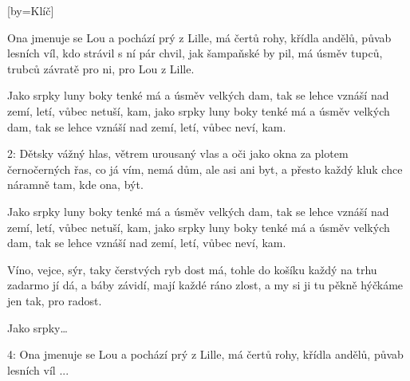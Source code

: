 [by={Klíč}]

\beginverse{}
Ona jmenuje se Lou a pochází prý z Lille,
má čertů rohy, křídla andělů, půvab lesních víl,
kdo strávil s ní pár chvil, jak šampaňské by pil,
má úsměv tupců, trubců závratě pro ni, pro Lou z Lille.
\endverse{}

\beginchorus{}
Jako srpky luny boky tenké má a úsměv velkých dam,
tak se lehce vznáší nad zemí, letí, vůbec netuší, kam,
jako srpky luny boky tenké má a úsměv velkých dam,
tak se lehce vznáší nad zemí, letí, vůbec neví, kam.
\endchorus{}

\beginverse{}
2: Dětsky vážný hlas, větrem urousaný vlas
a oči jako okna za plotem černočerných řas,
co já vím, nemá dům, ale asi ani byt,
a přesto každý kluk chce náramně tam, kde ona, být.
\endverse{}

\beginchorus{}
Jako srpky luny boky tenké má a úsměv velkých dam,
tak se lehce vznáší nad zemí, letí, vůbec netuší, kam,
jako srpky luny boky tenké má a úsměv velkých dam,
tak se lehce vznáší nad zemí, letí, vůbec neví, kam.
\endchorus{}

\beginverse{}
Víno, vejce, sýr, taky čerstvých ryb dost má,
tohle do košíku každý na trhu zadarmo jí dá,
a báby závidí, mají každé ráno zlost,
a my si ji tu pěkně hýčkáme jen tak, pro radost.
\endverse{}

\beginchorus{}
Jako srpky\ldots{}
\endchorus{}

\beginverse{}
4: Ona jmenuje se Lou a pochází prý z Lille,
má čertů rohy, křídla andělů, půvab lesních víl ...     
\endverse{}

\endsong{}
